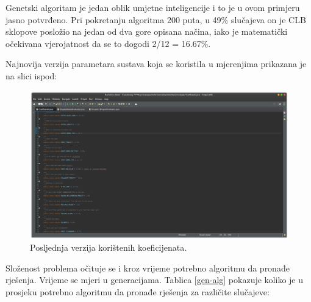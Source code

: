 \documentclass[times, utf8, zavrsni]{fer}
\begin{document}
		
		Genetski algoritam je jedan oblik umjetne inteligencije i to je u ovom primjeru jasno potvrđeno. Pri pokretanju algoritma 200 puta, u 49\% slučajeva on je CLB sklopove posložio na jedan od dva gore opisana načina, iako je matematički očekivana vjerojatnost da se to dogodi 2/12 = 16.67\%. 
		
		Najnovija verzija parametara sustava koja se koristila u mjerenjima prikazana je na slici ispod:
		
		
		\begin{figure}[H]
			\centering
			\includegraphics[width=18cm]{slike/koeficijenti.png}
			\caption{Posljednja verzija korištenih koeficijenata. }
			\label{fig:coeffs-last-version}
		\end{figure} 
		
		
		
		Složenost problema očituje se i kroz vrijeme potrebno algoritmu da pronađe rješenja. Vrijeme se mjeri u generacijama. Tablica \ref{gen-alg} pokazuje koliko je u prosjeku potrebno algoritmu da pronađe rješenja za različite slučajeve:
		
\end{document}
